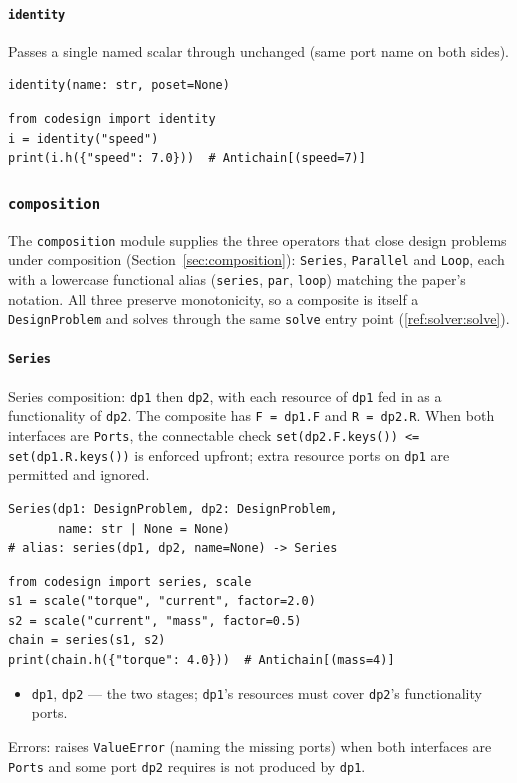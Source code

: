 \documentclass[11pt,a4paper]{article}
\begin{document}
\paragraph{\texttt{identity}}
\label{ref:primitives:identity}
Passes a single named scalar through unchanged (same port name on both
sides).
\begin{lstlisting}
identity(name: str, poset=None)
\end{lstlisting}
\begin{lstlisting}
from codesign import identity
i = identity("speed")
print(i.h({"speed": 7.0}))  # Antichain[(speed=7)]
\end{lstlisting}

\subsubsection{\texttt{composition}}
\label{ref:composition}

The \texttt{composition} module supplies the three operators that close
design problems under composition (Section~\ref{sec:composition}):
\texttt{Series}, \texttt{Parallel} and \texttt{Loop}, each with a
lowercase functional alias (\texttt{series}, \texttt{par}, \texttt{loop})
matching the paper's notation. All three preserve monotonicity, so a
composite is itself a \texttt{DesignProblem} and solves through the same
\texttt{solve} entry point (\ref{ref:solver:solve}).

\paragraph{\texttt{Series}}
\label{ref:composition:series}
Series composition: \texttt{dp1} then \texttt{dp2}, with each resource of
\texttt{dp1} fed in as a functionality of \texttt{dp2}. The composite has
\texttt{F = dp1.F} and \texttt{R = dp2.R}. When both interfaces are
\texttt{Ports}, the connectable check
\texttt{set(dp2.F.keys()) <= set(dp1.R.keys())} is enforced upfront;
extra resource ports on \texttt{dp1} are permitted and ignored.
\begin{lstlisting}
Series(dp1: DesignProblem, dp2: DesignProblem,
       name: str | None = None)
# alias: series(dp1, dp2, name=None) -> Series
\end{lstlisting}
\begin{lstlisting}
from codesign import series, scale
s1 = scale("torque", "current", factor=2.0)
s2 = scale("current", "mass", factor=0.5)
chain = series(s1, s2)
print(chain.h({"torque": 4.0}))  # Antichain[(mass=4)]
\end{lstlisting}
\begin{itemize}[nosep]
  \item \texttt{dp1}, \texttt{dp2} --- the two stages; \texttt{dp1}'s
        resources must cover \texttt{dp2}'s functionality ports.
\end{itemize}
Errors: raises \texttt{ValueError} (naming the missing ports) when both
interfaces are \texttt{Ports} and some port \texttt{dp2} requires is not
produced by \texttt{dp1}.
\end{document}
